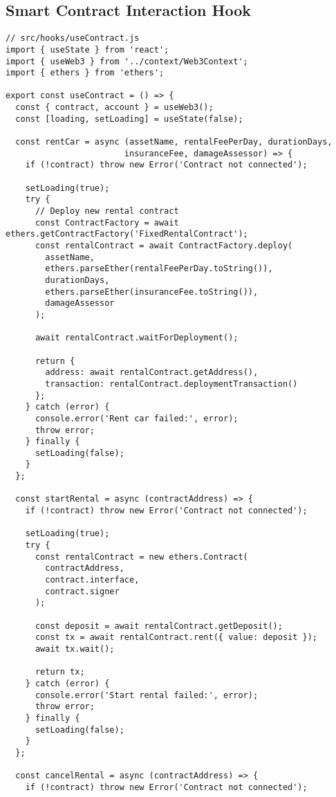 \documentclass[12pt,a4paper]{article}
\begin{document}
\subsection{Smart Contract Interaction Hook}
\begin{lstlisting}[caption=useContract Custom Hook]
// src/hooks/useContract.js
import { useState } from 'react';
import { useWeb3 } from '../context/Web3Context';
import { ethers } from 'ethers';

export const useContract = () => {
  const { contract, account } = useWeb3();
  const [loading, setLoading] = useState(false);

  const rentCar = async (assetName, rentalFeePerDay, durationDays, 
                        insuranceFee, damageAssessor) => {
    if (!contract) throw new Error('Contract not connected');
    
    setLoading(true);
    try {
      // Deploy new rental contract
      const ContractFactory = await ethers.getContractFactory('FixedRentalContract');
      const rentalContract = await ContractFactory.deploy(
        assetName,
        ethers.parseEther(rentalFeePerDay.toString()),
        durationDays,
        ethers.parseEther(insuranceFee.toString()),
        damageAssessor
      );

      await rentalContract.waitForDeployment();
      
      return {
        address: await rentalContract.getAddress(),
        transaction: rentalContract.deploymentTransaction()
      };
    } catch (error) {
      console.error('Rent car failed:', error);
      throw error;
    } finally {
      setLoading(false);
    }
  };

  const startRental = async (contractAddress) => {
    if (!contract) throw new Error('Contract not connected');
    
    setLoading(true);
    try {
      const rentalContract = new ethers.Contract(
        contractAddress,
        contract.interface,
        contract.signer
      );

      const deposit = await rentalContract.getDeposit();
      const tx = await rentalContract.rent({ value: deposit });
      await tx.wait();

      return tx;
    } catch (error) {
      console.error('Start rental failed:', error);
      throw error;
    } finally {
      setLoading(false);
    }
  };

  const cancelRental = async (contractAddress) => {
    if (!contract) throw new Error('Contract not connected');
    

\end{lstlisting}
\end{document}

